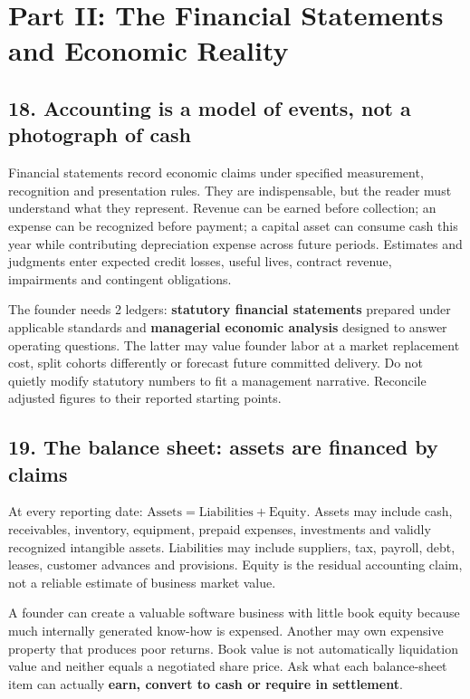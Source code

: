 \section{Part II: The Financial Statements and Economic Reality}

\subsection{18. Accounting is a model of events, not a photograph of cash}


Financial statements record economic claims under specified measurement, recognition and presentation rules. They are indispensable, but the reader must understand what they represent. Revenue can be earned before collection; an expense can be recognized before payment; a capital asset can consume cash this year while contributing depreciation expense across future periods. Estimates and judgments enter expected credit losses, useful lives, contract revenue, impairments and contingent obligations.

The founder needs 2 ledgers: \textbf{statutory financial statements} prepared under applicable standards and \textbf{managerial economic analysis} designed to answer operating questions. The latter may value founder labor at a market replacement cost, split cohorts differently or forecast future committed delivery. Do not quietly modify statutory numbers to fit a management narrative. Reconcile adjusted figures to their reported starting points.

\subsection{19. The balance sheet: assets are financed by claims}


At every reporting date: $\text{Assets} = \text{Liabilities} + \text{Equity}$. Assets may include cash, receivables, inventory, equipment, prepaid expenses, investments and validly recognized intangible assets. Liabilities may include suppliers, tax, payroll, debt, leases, customer advances and provisions. Equity is the residual accounting claim, not a reliable estimate of business market value.

A founder can create a valuable software business with little book equity because much internally generated know-how is expensed. Another may own expensive property that produces poor returns. Book value is not automatically liquidation value and neither equals a negotiated share price. Ask what each balance-sheet item can actually \textbf{earn, convert to cash or require in settlement}.

